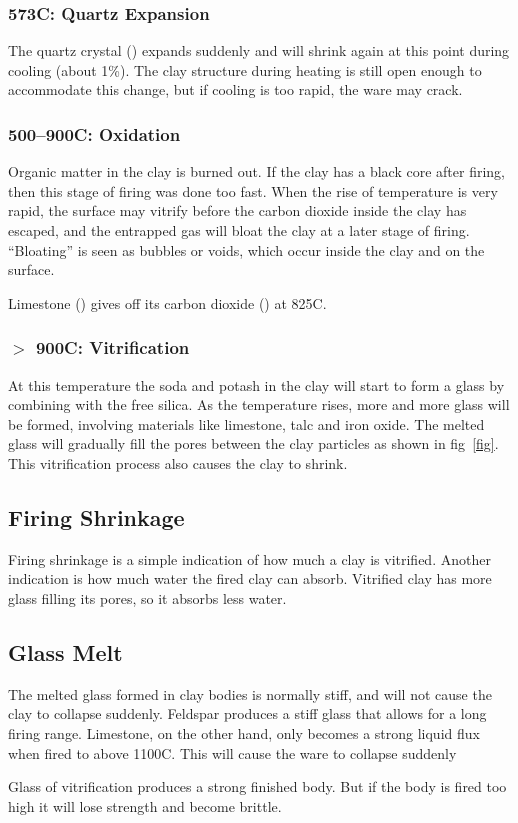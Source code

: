 \subsubsection{573\degree C: Quartz Expansion}
The quartz crystal () expands suddenly and will shrink again at this 
point during cooling (about 1\%). The clay structure during heating is still 
open enough to accommodate this change, but if cooling is too rapid, the ware 
may crack.
\subsubsection{500--900\degree C: Oxidation}
Organic matter in the clay is burned out. If the clay has a black core after 
firing, then this stage of firing was done too fast. When the rise of 
temperature is very rapid, the surface may vitrify before the carbon dioxide 
inside the clay has escaped, and the entrapped gas will bloat the clay at a 
later stage of firing. ``Bloating'' is seen as bubbles or voids, which occur 
inside the clay and on the surface.

Limestone () gives off its carbon dioxide () at 825\degree C.
\subsubsection{$>$ 900\degree C: Vitrification}
At this temperature the soda and potash in the clay will start to form a glass 
by combining with the free silica. As the temperature rises, more and more 
glass will be formed, involving materials like limestone, talc and iron oxide. 
The melted glass will gradually fill the pores between the clay particles as 
shown in fig~\ref{fig}. This vitrification process also causes the clay to 
shrink.
\subsection{Firing Shrinkage}
Firing shrinkage is a simple indication of how much a clay is vitrified. 
Another indication is how much water the fired clay can absorb. Vitrified clay 
has more glass filling its pores, so it absorbs less water.
\subsection{Glass Melt}
The melted glass formed in clay bodies is normally stiff, and will not cause 
the clay to collapse suddenly. Feldspar produces a stiff glass that allows for 
a long firing range. Limestone, on the other hand, only becomes a strong liquid 
flux when fired to above 1100\degree C. This will cause the ware to collapse 
suddenly

Glass of vitrification produces a strong finished body. But if the body is 
fired too high it will lose strength and become brittle.
